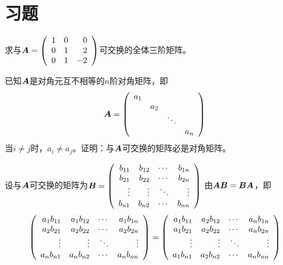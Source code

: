 \section{习题}

\begin{frame}
  \begin{footnotesize}
    \begin{li}{28}
      求与$\boldsymbol{A}=\left(
      \begin{array}{rrr}
        1&0&0\\
        0&1&2\\
        0&1&-2
      \end{array}
      \right)$可交换的全体三阶矩阵。
    \end{li}
  \end{footnotesize}
\end{frame}



\begin{frame}
  \begin{footnotesize}
    \begin{li}{29}
      已知$\boldsymbol{A}$是对角元互不相等的$n$阶对角矩阵，即
      $$
      \boldsymbol{A}=\left(
      \begin{array}{cccc}
        a_1&&&\\
        &a_2&&\\
        &&\ddots&\\
        &&&a_n
      \end{array}
      \right)
      $$
      当$i\ne j$时，$a_i\ne a_j$。证明：与$\boldsymbol{A}$可交换的矩阵必是对角矩阵。
    \end{li}
    \pause\proofname
    设与$\boldsymbol{A}$可交换的矩阵为$\boldsymbol{B}=\left(
    \begin{array}{rrrr}
      b_{11}&b_{12}&\cdots&b_{1n}\\
      b_{21}&b_{22}&\cdots&b_{2n}\\
      \vdots&\vdots&\ddots&\vdots\\
      b_{n1}&b_{n2}&\cdots&b_{nn}
    \end{array}
    \right)$
    由$\boldsymbol{A}\boldsymbol{B}=\boldsymbol{B}\boldsymbol{A}$，即
    $$
    \left(
    \begin{array}{rrrr}
      a_1b_{11}&a_1b_{12}&\cdots&a_1b_{1n}\\
      a_2b_{21}&a_2b_{22}&\cdots&a_2b_{2n}\\
      \vdots&\vdots&\ddots&\vdots\\
      a_nb_{n1}&a_nb_{n2}&\cdots&a_nb_{nn}
    \end{array}
    \right)=\left(
    \begin{array}{rrrr}
      a_1b_{11}&a_2b_{12}&\cdots&a_nb_{1n}\\
      a_1b_{21}&a_2b_{22}&\cdots&a_nb_{2n}\\
      \vdots&\vdots&\ddots&\vdots\\
      a_1b_{n1}&a_2b_{n2}&\cdots&a_nb_{nn}
    \end{array}
    \right)
    $$
  \end{footnotesize}
\end{frame}

